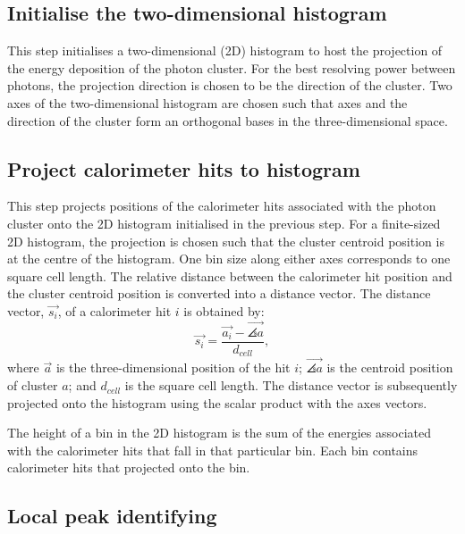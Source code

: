 \subsection{Initialise the  two-dimensional histogram}

This step initialises a two-dimensional (2D) histogram to host the projection of the energy deposition of the photon cluster. For the best resolving power between photons, the projection direction is chosen to be the direction of the cluster. Two axes of the two-dimensional histogram are chosen such that axes and the direction of the cluster form an orthogonal bases in the three-dimensional space.




\subsection{Project calorimeter hits to histogram}

This step projects positions of the calorimeter hits associated with the photon cluster onto the 2D histogram initialised in the previous step. For a finite-sized 2D histogram, the projection is chosen such that the cluster centroid position is at the centre of the histogram. One bin size along either axes corresponds to one \ECAL square cell length. The relative distance between the calorimeter hit position and the cluster centroid position is converted into a distance vector. The distance vector, $\vec{s_{i}}$, of a calorimeter hit $i$ is obtained by:
\begin{equation}
\vec{s_{i}} = \frac{\vec{a_{i}} -  \vec{\angles{a}}}{d_{cell}},
\end{equation}
where $\vec{a}$ is the three-dimensional position of the hit $i$;  $\vec{\angles{a}}$ is the centroid position of cluster $a$; and $d_{cell}$ is the  \ECAL square cell length. The distance vector is subsequently projected onto the histogram using the scalar product with the axes vectors.


The height of a bin in the 2D histogram is the sum of the energies associated with the calorimeter hits that fall in that particular bin. Each bin contains calorimeter hits that projected onto the bin.


\subsection{Local peak identifying}

